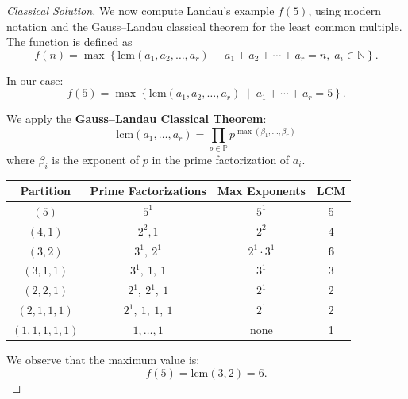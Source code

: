 \documentclass[11pt]{article}
\theoremstyle{plain}
\begin{document}
\begin{proof}[Classical Solution]
 We now compute Landau's example \( f(5) \), using modern notation and the Gauss--Landau classical theorem for the least common multiple. The function is defined as
\[
f(n) = \max \left\{ \mathrm{lcm}(a_1, a_2, \dots, a_r) \;\middle|\; a_1 + a_2 + \cdots + a_r = n,\; a_i \in \mathbb{N} \right\}.
\]

\noindent
In our case:
\[
f(5) = \max \left\{ \mathrm{lcm}(a_1, a_2, \dots, a_r) \;\middle|\; a_1 + \cdots + a_r = 5 \right\}.
\]

\noindent
We apply the \textbf{Gauss--Landau Classical Theorem}:
\[
\mathrm{lcm}(a_1, \dots, a_r) = \prod_{p \in \mathbb{P}} p^{\max(\beta_{1}, \dots, \beta_{r})}
\]
where \( \beta_i \) is the exponent of \( p \) in the prime factorization of \( a_i \).

\vspace{1em}

\begin{center}
\renewcommand{\arraystretch}{1.2}
\begin{tabular}{|c|c|c|c|}
\hline
\textbf{Partition} & \textbf{Prime Factorizations} & \textbf{Max Exponents} & \textbf{LCM} \\
\hline
\( (5) \) & \( 5^1 \) & \( 5^1 \) & 5 \\
\hline
\( (4,1) \) & \( 2^2, 1 \) & \( 2^2 \) & 4 \\
\hline
\( (3,2) \) & \( 3^1,\ 2^1 \) & \( 2^1 \cdot 3^1 \) & \textbf{6} \\
\hline
\( (3,1,1) \) & \( 3^1,\ 1,\ 1 \) & \( 3^1 \) & 3 \\
\hline
\( (2,2,1) \) & \( 2^1,\ 2^1,\ 1 \) & \( 2^1 \) & 2 \\
\hline
\( (2,1,1,1) \) & \( 2^1,\ 1,\ 1,\ 1 \) & \( 2^1 \) & 2 \\
\hline
\( (1,1,1,1,1) \) & \( 1,\dots,1 \) & none & 1 \\
\hline
\end{tabular}
\end{center}

\vspace{1em}

\noindent
We observe that the maximum value is:
\[
f(5) = \mathrm{lcm}(3,2) = 6.
\]
\end{proof}
\end{document}
